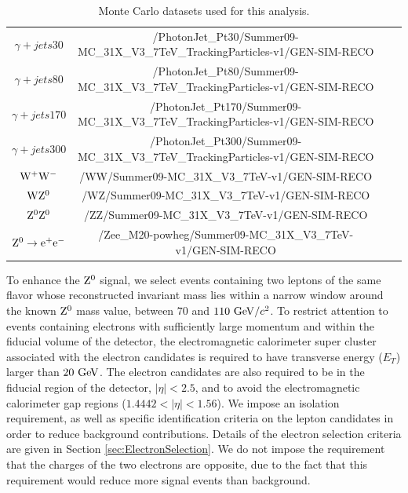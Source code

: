 \documentclass{cmspaper}
\begin{document}
\begin{table}[!ht]
\begin{center}
\begin{tabular}{|c|c|r|c|}
 $\gamma+jets 30$           & /PhotonJet\_Pt30/Summer09-MC\_31X\_V3\_7TeV\_TrackingParticles-v1/GEN-SIM-RECO  \\
 $\gamma+jets 80$           & /PhotonJet\_Pt80/Summer09-MC\_31X\_V3\_7TeV\_TrackingParticles-v1/GEN-SIM-RECO   \\
 $\gamma+jets 170$          & /PhotonJet\_Pt170/Summer09-MC\_31X\_V3\_7TeV\_TrackingParticles-v1/GEN-SIM-RECO  \\
 $\gamma+jets 300$          & /PhotonJet\_Pt300/Summer09-MC\_31X\_V3\_7TeV\_TrackingParticles-v1/GEN-SIM-RECO  \\
 $\mathrm{W^+}\mathrm{W^-} $                   & /WW/Summer09-MC\_31X\_V3\_7TeV-v1/GEN-SIM-RECO  \\
 $\mathrm{W}\mathrm{Z^0} $                     & /WZ/Summer09-MC\_31X\_V3\_7TeV-v1/GEN-SIM-RECO  \\
 $\mathrm{Z^0}\mathrm{Z^0} $                     & /ZZ/Summer09-MC\_31X\_V3\_7TeV-v1/GEN-SIM-RECO  \\
 $\mathrm{Z^0} \rightarrow \mathrm{e}^{+}\mathrm{e}^{-}$            & /Zee\_M20-powheg/Summer09-MC\_31X\_V3\_7TeV-v1/GEN-SIM-RECO            \\

\hline
\end{tabular}
\caption{Monte Carlo datasets used for this analysis.\label{tab:datasets}}
\end{center}
\end{table}









\label{sec:eventSelection}
To enhance the $\mathrm{Z^0}$ signal, we select events containing two leptons of the same flavor whose reconstructed invariant mass lies within a narrow window around the known $\mathrm{Z^0}$ mass value, between $70$ and $110\ \mathrm{Ge\kern -0.1em V/}c^2$. To restrict attention to events containing electrons with sufficiently large momentum and within the fiducial volume of the detector, the electromagnetic calorimeter super cluster associated with the electron candidates is required to have transverse energy ($E_{T}$) larger than $20\ \mathrm{Ge\kern -0.1em V}$. The electron candidates are also required to be in the fiducial region of the detector, $|\eta| < 2.5$, and to avoid the electromagnetic calorimeter gap regions ($1.4442 < |\eta| < 1.56$). We impose an isolation requirement, as well as specific identification criteria on the lepton candidates in order to reduce background contributions. Details of the electron selection criteria are given in Section \ref{sec:ElectronSelection}. We do not impose the requirement that the charges of the two electrons are opposite, due to the fact that this requirement would reduce more signal events than background. 
\end{document}
